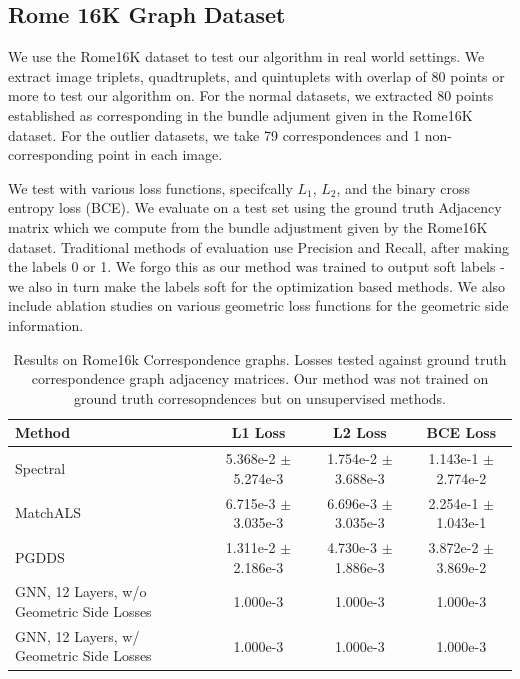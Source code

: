 \documentclass[10pt,twocolumn,letterpaper]{article}
\begin{document}
\subsection{Rome 16K Graph Dataset}
We  use the Rome16K dataset \cite{li2010location} to test our algorithm in real world settings.
We extract image triplets, quadtruplets, and quintuplets with overlap of 80 points or more to test our algorithm on. For the normal datasets, we extracted 80 points established as corresponding in the bundle adjument given in the Rome16K dataset. For the outlier datasets, we take 79 correspondences and 1 non-corresponding point in each image.

We test with various loss functions, specifcally $L_1$, $L_2$, and the binary cross entropy loss (BCE).
We evaluate on a test set using the ground truth Adjacency matrix which we compute from the bundle adjustment given by the Rome16K dataset.
Traditional methods of evaluation use Precision and Recall, after making the labels 0 or 1.
We forgo this as our method was trained to output soft labels - we also in turn make the labels soft for the optimization based methods.
We also include ablation studies on various geometric loss functions for the geometric side information.


\begin{table}
\begin{center}
\begin{tabular}{|l|c|c|c|}
\hline
Method & L1 Loss & L2 Loss & BCE Loss \\
\hline\hline\hline
Spectral                                  & 5.368e-2 $\pm$ 5.274e-3 & 1.754e-2 $\pm$ 3.688e-3 & 1.143e-1 $\pm$ 2.774e-2 \\ \hline
MatchALS                                  & 6.715e-3 $\pm$ 3.035e-3 & 6.696e-3 $\pm$ 3.035e-3 & 2.254e-1 $\pm$ 1.043e-1 \\ \hline
PGDDS                                     & 1.311e-2 $\pm$ 2.186e-3 & 4.730e-3 $\pm$ 1.886e-3 & 3.872e-2 $\pm$ 3.869e-2 \\ \hline
GNN, 12 Layers, w/o Geometric Side Losses & 1.000e-3 & 1.000e-3 & 1.000e-3 \\ \hline
GNN, 12 Layers, w/ Geometric Side Losses  & 1.000e-3 & 1.000e-3 & 1.000e-3 \\ \hline
\hline
\end{tabular}
\end{center}
\caption{
Results on Rome16k Correspondence graphs.
Losses tested against ground truth correspondence graph adjacency matrices.
Our method was not trained on ground truth corresopndences but on unsupervised methods.
}
\end{table}
\end{document}
